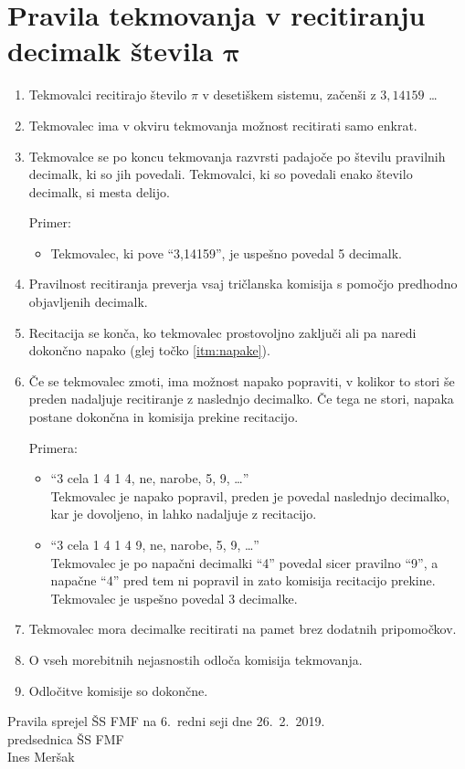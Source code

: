 \documentclass[a4paper,oneside,12pt]{article}
\title{\Title}
\author{\Author}
\date{\today}
\theoremstyle{definition}
\begin{document}
\section*{Pravila tekmovanja v recitiranju decimalk števila $\boldsymbol \pi$}

\vspace{3ex}

\begin{enumerate}
  \item Tekmovalci recitirajo število $\pi$ v desetiškem sistemu, začenši z $3,14159$ \ldots
  \item Tekmovalec ima v okviru tekmovanja možnost recitirati samo enkrat.
  \item Tekmovalce se po koncu tekmovanja razvrsti padajoče po številu pravilnih decimalk, ki so jih povedali.
    Tekmovalci, ki so povedali enako število decimalk, si mesta delijo.

    Primer: \\[-20pt]
    \begin{itemize}
      \item Tekmovalec, ki pove ``3,14159'', je uspešno povedal 5 decimalk.
    \end{itemize}

  \item Pravilnost recitiranja preverja vsaj tričlanska komisija s pomočjo predhodno objavljenih
    decimalk.

  \item Recitacija se konča, ko tekmovalec prostovoljno zaključi ali pa naredi dokončno napako
    (glej točko \ref{itm:napake}).

  \item \label{itm:napake} Če se tekmovalec zmoti, ima možnost napako popraviti, v kolikor to stori še preden  nadaljuje
    recitiranje z naslednjo decimalko. Če tega ne stori, napaka postane dokončna in komisija prekine
    recitacijo.

    Primera: \\[-20pt]
    \begin{itemize}
      \item ``3 cela 1 4 1 4, ne, narobe, 5, 9, \ldots'' \\
        Tekmovalec je napako popravil, preden je povedal naslednjo decimalko, kar
        je dovoljeno, in lahko nadaljuje z recitacijo.
      \item ``3 cela 1 4 1 4 9, ne, narobe, 5, 9, \ldots'' \\
        Tekmovalec je po napačni decimalki ``4'' povedal sicer pravilno ``9'', a napačne ``4'' pred
        tem ni popravil in zato komisija recitacijo prekine. Tekmovalec je uspešno povedal 3 decimalke.
    \end{itemize}
  \item Tekmovalec mora decimalke recitirati na pamet brez dodatnih pripomočkov.
  \item O vseh morebitnih nejasnostih odloča komisija tekmovanja.
  \item Odločitve komisije so dokončne.
\end{enumerate}

\vspace{3ex}

Pravila sprejel ŠS FMF na 6.~redni seji dne 26.~2.~2019. \\

\hspace*{\fill} predsednica ŠS FMF \\
\hspace*{\fill} Ines Meršak
\end{document}

